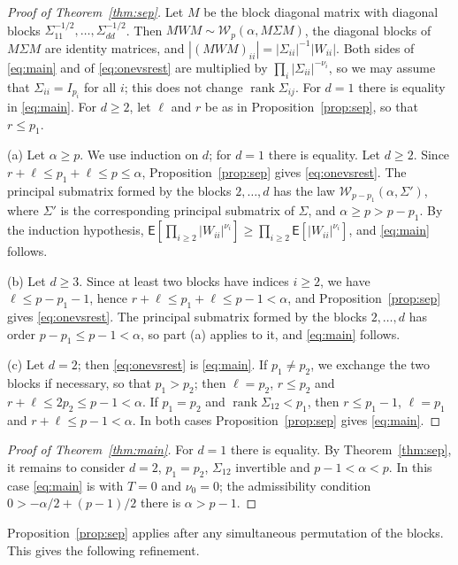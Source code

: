 \documentclass{amsart}
\theoremstyle{definition}
\theoremstyle{remark}
\numberwithin{equation}{section}
\newcommand{\E}{\mathsf{E}}
\newcommand{\W}{\mathcal{W}}
\newcommand{\rank}{\operatorname{rank}}
\begin{document}
\begin{proof}[Proof of Theorem~\ref{thm:sep}]
Let $M$ be the block diagonal matrix with diagonal blocks $\Sigma_{11}^{-1/2},\dots,\Sigma_{dd}^{-1/2}$. Then $MWM\sim\W_p(\alpha,M\Sigma M)$, the diagonal blocks of $M\Sigma M$ are identity matrices, and $|(MWM)_{ii}|=|\Sigma_{ii}|^{-1}|W_{ii}|$. Both sides of \eqref{eq:main} and of \eqref{eq:onevsrest} are multiplied by $\prod_i|\Sigma_{ii}|^{-\nu_i}$, so we may assume that $\Sigma_{ii}=I_{p_i}$ for all $i$; this does not change $\rank\Sigma_{ij}$. For $d=1$ there is equality in \eqref{eq:main}. For $d\ge2$, let $\ell$ and $r$ be as in Proposition~\ref{prop:sep}, so that $r\le p_1$.

(a) Let $\alpha\ge p$. We use induction on $d$; for $d=1$ there is equality. Let $d\ge2$. Since $r+\ell\le p_1+\ell\le p\le\alpha$, Proposition~\ref{prop:sep} gives \eqref{eq:onevsrest}. The principal submatrix formed by the blocks $2,\dots,d$ has the law $\W_{p-p_1}(\alpha,\Sigma')$, where $\Sigma'$ is the corresponding principal submatrix of $\Sigma$, and $\alpha\ge p>p-p_1$. By the induction hypothesis, $\E[\prod_{i\ge2}|W_{ii}|^{\nu_i}]\ge\prod_{i\ge2}\E[|W_{ii}|^{\nu_i}]$, and \eqref{eq:main} follows.

(b) Let $d\ge3$. Since at least two blocks have indices $i\ge2$, we have $\ell\le p-p_1-1$, hence $r+\ell\le p_1+\ell\le p-1<\alpha$, and Proposition~\ref{prop:sep} gives \eqref{eq:onevsrest}. The principal submatrix formed by the blocks $2,\dots,d$ has order $p-p_1\le p-1<\alpha$, so part (a) applies to it, and \eqref{eq:main} follows.

(c) Let $d=2$; then \eqref{eq:onevsrest} is \eqref{eq:main}. If $p_1\ne p_2$, we exchange the two blocks if necessary, so that $p_1>p_2$; then $\ell=p_2$, $r\le p_2$ and $r+\ell\le2p_2\le p-1<\alpha$. If $p_1=p_2$ and $\rank\Sigma_{12}<p_1$, then $r\le p_1-1$, $\ell=p_1$ and $r+\ell\le p-1<\alpha$. In both cases Proposition~\ref{prop:sep} gives \eqref{eq:main}.
\end{proof}

\begin{proof}[Proof of Theorem~\ref{thm:main}]
For $d=1$ there is equality. By Theorem~\ref{thm:sep}, it remains to consider $d=2$, $p_1=p_2$, $\Sigma_{12}$ invertible and $p-1<\alpha<p$. In this case \eqref{eq:main} is \cite[Corollary~3.4]{GOR25} with $T=0$ and $\nu_0=0$; the admissibility condition $0>-\alpha/2+(p-1)/2$ there is $\alpha>p-1$.
\end{proof}

Proposition~\ref{prop:sep} applies after any simultaneous permutation of the blocks. This gives the following refinement.
\end{document}
